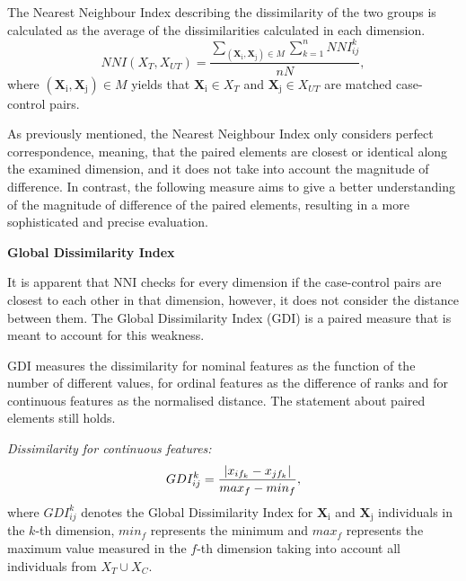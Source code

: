 The Nearest Neighbour Index describing the dissimilarity of the two groups is calculated as the average of the dissimilarities calculated in each dimension.
\begin{equation}
	NNI(X_T,X_{UT})=\frac{\sum_{(\bm{\mathrm{\textbf{X}_i}}, \bm{\mathrm{\textbf{X}_j}})\in M}\sum_{k=1}^nNNI_{ij}^k}{nN}\label{eq:nni},
\end{equation}
where $(\bm{\mathrm{\textbf{X}_i}}, \bm{\mathrm{\textbf{X}_j}})\in M$ yields that $\bm{\mathrm{\textbf{X}_i}} \in X_T$ and $\bm{\mathrm{\textbf{X}_j}} \in X_{UT}$ are matched case-control pairs. %

As previously mentioned, the Nearest Neighbour Index only considers perfect correspondence, meaning, that the paired elements are closest or identical along the examined dimension, and it does not take into account the magnitude of difference. In contrast, the following measure aims to give a better understanding of the magnitude of difference of the paired elements, resulting in a more sophisticated and precise evaluation.  

\vspace{0.5cm}
\noindent \textbf{Global Dissimilarity Index}

\noindent It is apparent that NNI checks for every dimension if the case-control pairs are closest to each other in that dimension, however, it does not consider the distance between them. The Global Dissimilarity Index (GDI) is a paired measure that is meant to account for this weakness.

GDI measures the dissimilarity for nominal features as the function of the number of different values, for ordinal features as the difference of ranks and for continuous features as the normalised distance. The statement about paired elements still holds.

\vspace{0.3cm}
\noindent\emph{Dissimilarity for continuous features:}
\begin{equation}
	GDI_{ij}^k=\frac{\lvert x_{if_k}-x_{jf_k}\rvert}{max_f-min_f},
	\label{eq:ddi_cont}
\end{equation}
where $GDI_{ij}^{k}$ denotes the Global Dissimilarity Index for $\bm{\mathrm{\textbf{X}_i}}$ and $\bm{\mathrm{\textbf{X}_j}}$ individuals in the $k$-th dimension, $min_f$ represents the minimum and $max_f$ represents the maximum value measured in the $f$-th dimension taking into account all individuals from ${X_T \cup X_C}$.

